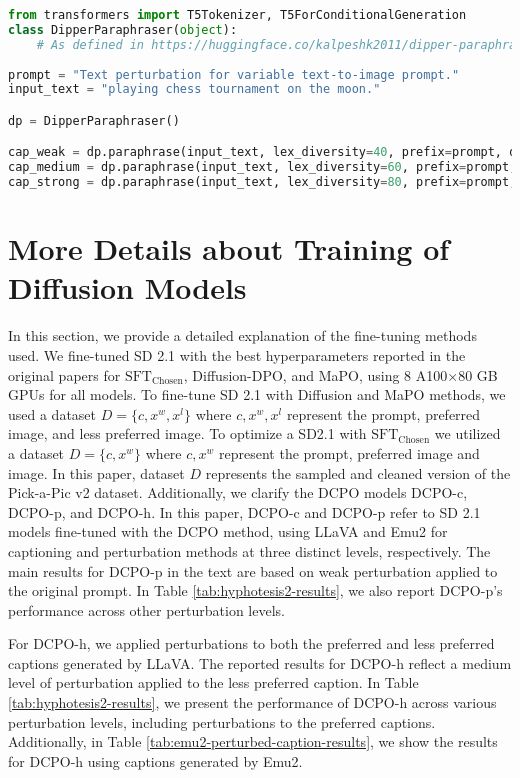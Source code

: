 \begin{lstlisting}[language=Python]
from transformers import T5Tokenizer, T5ForConditionalGeneration
class DipperParaphraser(object):
    # As defined in https://huggingface.co/kalpeshk2011/dipper-paraphraser-xxl
    
prompt = "Text perturbation for variable text-to-image prompt."
input_text = "playing chess tournament on the moon."

dp = DipperParaphraser()

cap_weak = dp.paraphrase(input_text, lex_diversity=40, prefix=prompt, do_sample=True, top_p=0.75, top_k=None, max_length=256)
cap_medium = dp.paraphrase(input_text, lex_diversity=60, prefix=prompt, do_sample=True, top_p=0.75, top_k=None, max_length=256)
cap_strong = dp.paraphrase(input_text, lex_diversity=80, prefix=prompt, do_sample=True, top_p=0.75, top_k=None, max_length=256)
\end{lstlisting}


\section{More Details about Training of Diffusion Models}
\label{sec:appendix_details_train}
In this section, we provide a detailed explanation of the fine-tuning methods used. We fine-tuned SD 2.1 with the best hyperparameters reported in the original papers for \( \text{SFT}_{\text{Chosen}} \), Diffusion-DPO, and MaPO, using 8 A100×80 GB GPUs for all models. To fine-tune SD 2.1 with Diffusion and MaPO methods, we used a dataset \(D=\{c,x^w,x^l\}\) where \(c,x^w,x^l\) represent the prompt, preferred image, and less preferred image. To optimize a SD2.1 with \( \text{SFT}_{\text{Chosen}} \) we utilized a dataset \(D=\{c,x^w\}\) where \(c,x^w\) represent the prompt, preferred image and image. In this paper, dataset $D$ represents the sampled and cleaned version of the Pick-a-Pic v2 dataset. Additionally, we clarify the DCPO models DCPO-c, DCPO-p, and DCPO-h. In this paper, DCPO-c and DCPO-p refer to SD 2.1 models fine-tuned with the DCPO method, using LLaVA and Emu2 for captioning and perturbation methods at three distinct levels, respectively. The main results for DCPO-p in the text are based on weak perturbation applied to the original prompt. In Table \ref{tab:hyphotesis2-results}, we also report DCPO-p's performance across other perturbation levels.


For DCPO-h, we applied perturbations to both the preferred and less preferred captions generated by LLaVA. The reported results for DCPO-h reflect a medium level of perturbation applied to the less preferred caption. In Table \ref{tab:hyphotesis2-results}, we present the performance of DCPO-h across various perturbation levels, including perturbations to the preferred captions. Additionally, in Table \ref{tab:emu2-perturbed-caption-results}, we show the results for DCPO-h using captions generated by Emu2.

